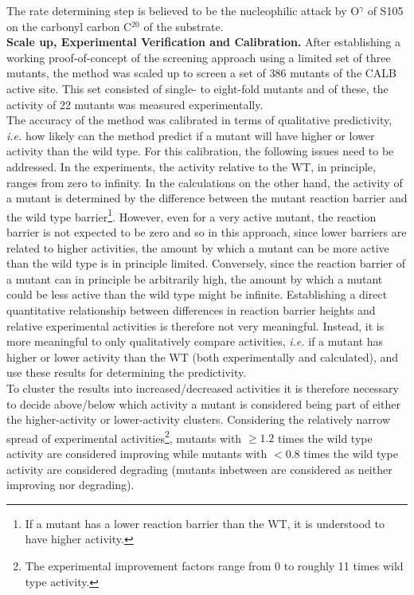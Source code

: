 The rate determining step is believed to be the nucleophilic attack by O$^\gamma$ of S105 on the carbonyl carbon C$^{20}$ of the substrate.\\
\textbf{Scale up, Experimental Verification and Calibration.}
After establishing a working proof-of-concept of the screening approach using a limited set of three mutants\cite{10.1371/journal.pone.0049849}, the method was scaled up to screen a set of 386 mutants of the CALB active site\cite{hediger2013silico}.
This set consisted of single- to eight-fold mutants and of these, the activity of 22 mutants was measured experimentally.\\
The accuracy of the method was calibrated in terms of qualitative predictivity, \textit{i.e.} how likely can the method predict if a mutant will have higher or lower activity than the wild type.
For this calibration, the following issues need to be addressed.
In the experiments, the activity relative to the WT, in principle, ranges from zero to infinity.
In the calculations on the other hand, the activity of a mutant is determined by the difference between the mutant reaction barrier and the wild type barrier\footnote{If a mutant has a lower reaction barrier than the WT, it is understood to have higher activity.}.
However, even for a very active mutant, the reaction barrier is not expected to be zero and so in this approach, since lower barriers are related to higher activities, the amount by which a mutant can be more active than the wild type is in principle limited.
Conversely, since the reaction barrier of a mutant can in principle be arbitrarily high, the amount by which a mutant could be less active than the wild type might be infinite.
Establishing a direct quantitative relationship between differences in reaction barrier heights and relative experimental activities is therefore not very meaningful.
Instead, it is more meaningful to only qualitatively compare activities, \textit{i.e.} if a mutant has higher or lower activity than the WT (both experimentally and calculated), and use these results for determining the predictivity.\\
To cluster the results into increased/decreased activities it is therefore necessary to decide above/below which activity a mutant is considered being part of either the higher-activity or lower-activity clusters.
Considering the relatively narrow spread of experimental activities\footnote{The experimental improvement factors range from 0 to roughly 11 times wild type activity.}, mutants with $\geq1.2$ times the wild type activity are considered improving while mutants with $<0.8$ times the wild type activity are considered degrading (mutants inbetween are considered as neither improving nor degrading)\cite{hediger2013silico}.
